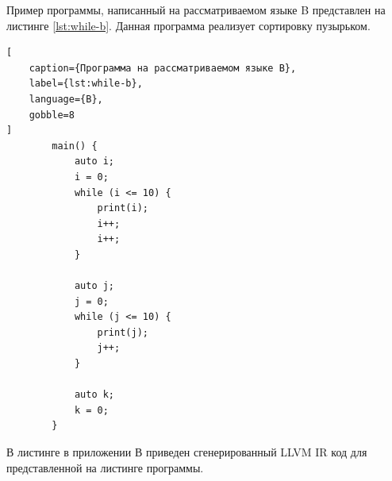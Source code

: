 Пример программы, написанный на рассматриваемом языке B представлен на листинге \ref{lst:while-b}.
Данная программа реализует сортировку пузырьком.

\begin{lstlisting}[
	caption={Программа на рассматриваемом языкe B},
	label={lst:while-b},
	language={B},
	gobble=8
]
        main() {
            auto i;
            i = 0;
            while (i <= 10) {
                print(i);
                i++;
                i++;
            }

            auto j;
            j = 0;
            while (j <= 10) {
                print(j);
                j++;
            }

            auto k;
            k = 0;
        }
\end{lstlisting}

В листинге в приложении В приведен сгенерированный LLVM IR код для представленной на листинге программы.